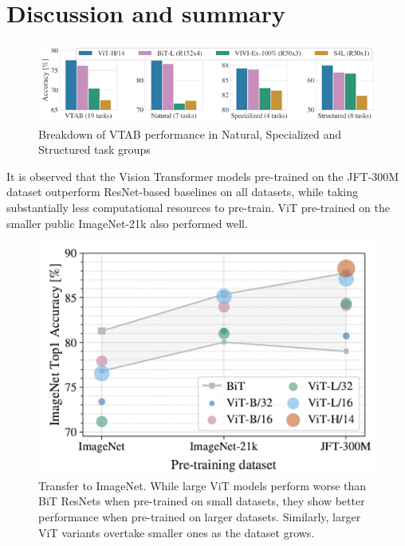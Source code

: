 \documentclass[conference]{IEEEtran}
\begin{document}
\section{Discussion and summary}

\begin{figure}[htbp]
\centerline{\includegraphics[width=1\linewidth]{vtab_performance_comparison.png}}
\caption{Breakdown of VTAB performance in Natural, Specialized and Structured task groups}

\end{figure}

It is observed that the Vision Transformer models pre-trained on the JFT-300M dataset outperform ResNet-based baselines on all datasets, while taking substantially less computational resources to pre-train.
ViT pre-trained on the smaller public ImageNet-21k also performed well.


\begin{figure}[htbp]
\centerline{\includegraphics[width=1\linewidth]{imagenet_top_1_accuracy.png}}
\caption{Transfer to ImageNet. While large ViT models perform worse than BiT ResNets when pre-trained on small datasets, they show better performance when pre-trained on larger datasets. Similarly, larger ViT variants overtake smaller ones as the dataset grows.}

\end{figure}
\end{document}
